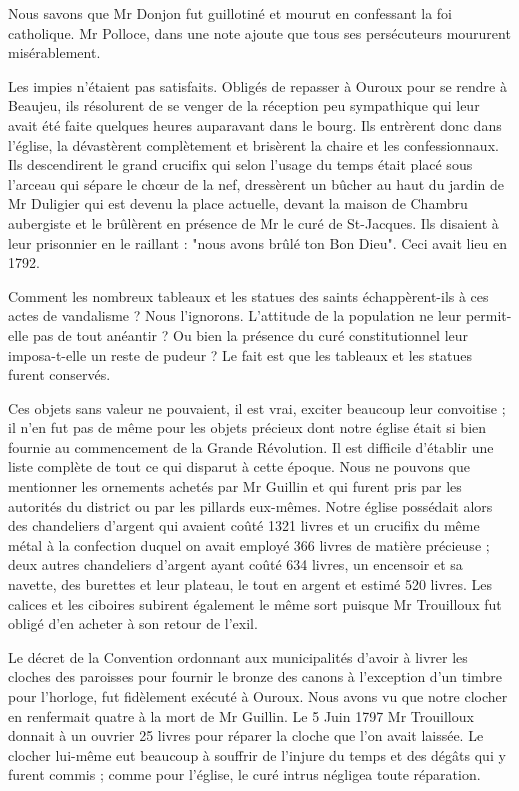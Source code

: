 Nous savons que Mr Donjon fut guillotiné et mourut en confessant la foi catholique. Mr Polloce, dans une note ajoute que tous ses persécuteurs moururent misérablement.

Les impies n'étaient pas satisfaits. Obligés de repasser à Ouroux pour se rendre à Beaujeu, ils résolurent de se venger de la réception peu sympathique qui leur avait été faite quelques heures auparavant dans le bourg. Ils entrèrent donc dans l'église, la dévastèrent complètement et brisèrent la chaire et les confessionnaux. Ils descendirent le grand crucifix qui selon l'usage du temps était placé sous l'arceau qui sépare le chœur de la nef, dressèrent un bûcher au haut du jardin de Mr Duligier qui est devenu la place actuelle, devant la maison de Chambru aubergiste et le brûlèrent en présence de Mr le curé de St-Jacques. Ils disaient à leur prisonnier en le raillant : "nous avons brûlé ton Bon Dieu". Ceci avait lieu en 1792.

Comment les nombreux tableaux et les statues des saints échappèrent-ils à ces actes de vandalisme ? Nous l'ignorons. L'attitude de la population ne leur permit-elle pas de tout anéantir ? Ou bien la
présence du curé constitutionnel leur imposa-t-elle un reste de pudeur ? Le fait est que les tableaux et les statues furent conservés.

Ces objets sans valeur ne pouvaient, il est vrai, exciter beaucoup leur convoitise ; il n'en fut pas de même pour les objets précieux dont notre église était si bien fournie au commencement de la Grande Révolution. Il est difficile d'établir une liste complète de tout ce qui disparut à cette époque. Nous ne pouvons que mentionner les ornements achetés par Mr Guillin et qui furent pris par les autorités du district ou par les pillards eux-mêmes. Notre église possédait alors des chandeliers d'argent qui avaient coûté 1321 livres et un crucifix du même métal à la confection duquel on avait employé 366 livres de matière précieuse ; deux autres chandeliers d'argent ayant coûté 634 livres, un encensoir et sa navette, des burettes et leur plateau, le tout en argent et estimé 520 livres. Les calices et les ciboires subirent également le même sort puisque Mr Trouilloux fut obligé d'en acheter à son retour de l'exil.

Le décret de la Convention ordonnant aux municipalités d'avoir à livrer les cloches des paroisses pour fournir le bronze des canons à l'exception d'un timbre pour l'horloge, fut fidèlement exécuté à Ouroux. Nous avons vu que notre clocher en renfermait quatre à la mort de Mr Guillin. Le 5 Juin 1797 Mr Trouilloux donnait à un ouvrier 25 livres pour réparer la cloche que l'on avait laissée. Le clocher lui-même eut beaucoup à souffrir de l'injure du temps et des dégâts qui y furent commis ; comme pour l'église, le curé intrus négligea toute réparation.

